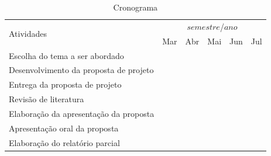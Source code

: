 \documentclass[12pt, a4paper, twoside]{article}
\numberwithin{equation}{subsection} %
\begin{document}
		\begin{table}[H]
		\centering
		\footnotesize
		\caption{Cronograma}
			\begin{tabular}{|l|c|c|c|c|c|} \hline
				\multirow{2}{*}{Atividades} & \multicolumn{5}{c|}{$semestre$/$ano$} \\ \cline{2-6}				
				  & Mar & Abr & Mai & Jun & Jul \\ \hline	
			     
			    Escolha do tema a ser abordado    & \cellcolor{midgray} & \cellcolor{midgray} & & & \\ \hline
		 	Desenvolvimento da proposta de projeto & & \cellcolor{midgray} & & &\\ \hline     
				Entrega da proposta de projeto      &  &  & \cellcolor{midgray} & &\\ \hline        
				Revisão de literatura     & & & \cellcolor{midgray} & \cellcolor{midgray} & \cellcolor{midgray} \\ \hline      
				Elaboração da apresentação da proposta    & & & & & \cellcolor{midgray} \\ \hline        
				Apresentação oral da proposta    & & & & & \cellcolor{midgray}\\ \hline        
				Elaboração do relatório parcial  & & & & & \cellcolor{midgray} \\ \hline
				
				
        	\end{tabular}
		\end{table}

\newpage




\end{document}
